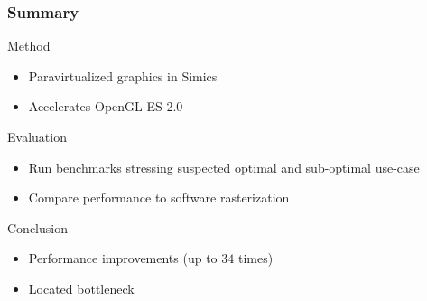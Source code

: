 \begin{frame}
  \frametitle{Summary}

  \begin{block}{Method}
    \begin{itemize}
    \item Paravirtualized graphics in Simics
    \item Accelerates OpenGL ES 2.0
    \end{itemize}
  \end{block}

  \begin{block}{Evaluation}
    \begin{itemize}
    \item Run benchmarks stressing suspected optimal and sub-optimal use-case
    \item Compare performance to software rasterization
    \end{itemize}
  \end{block}

  \begin{block}{Conclusion}
    \begin{itemize}
    \item Performance improvements (up to $34$ times)
    \item Located bottleneck
    \end{itemize}
  \end{block}

\end{frame}
